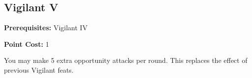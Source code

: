\subsection{Vigilant V}\label{feat:vigilant5}

\noindent
\textbf{Prerequisites:} Vigilant IV

\noindent
\textbf{Point Cost:} 1

You may make 5 extra opportunity attacks per round. This replaces the effect
of previous Vigilant feats.
